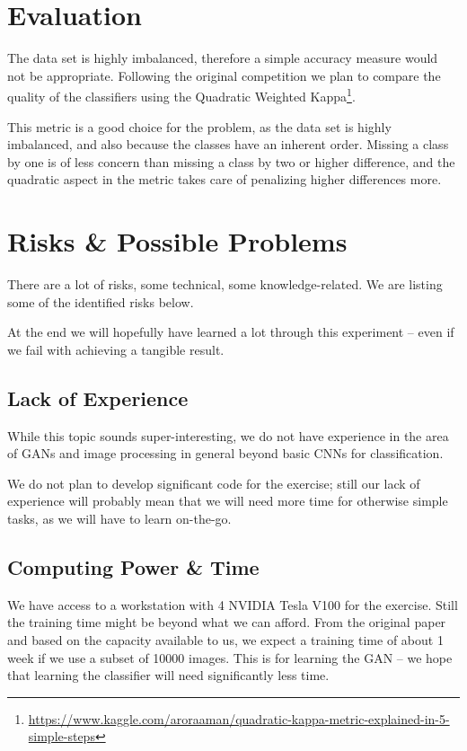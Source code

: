 \documentclass[sigconf,nonacm]{acmart}
\begin{document}
\section{Evaluation}

The data set is highly imbalanced, therefore a simple
accuracy measure would not be appropriate.
Following the original
competition we plan to compare the quality of the classifiers
using the Quadratic Weighted
Kappa\footnote{\url{https://www.kaggle.com/aroraaman/quadratic-kappa-metric-explained-in-5-simple-steps}}.

This metric is a good choice for the problem, as the data set
is highly imbalanced, and also because the classes have an
inherent order.
Missing a class by one is of less concern than missing a class
by two or higher difference, and the quadratic
aspect in the metric takes care of penalizing higher differences
more.

\section{Risks \& Possible Problems}

There are a lot of risks, some technical, some knowledge-related.
We are listing some of the identified risks below.

At the end we will hopefully have learned a lot through this
experiment -- even if we fail with achieving a tangible result.

\subsection{Lack of Experience}

While this topic sounds super-interesting, we do not have
experience in the area of GANs and image processing in general
beyond basic CNNs for classification.

We do not plan to develop significant code for the exercise; still
our lack of experience will probably mean that we will need
more time for otherwise simple tasks, as we will have to
learn on-the-go.

\subsection{Computing Power \& Time}

We have access to a workstation with 4 NVIDIA Tesla V100 for
the exercise.
Still the training time might be beyond what we can afford.
From the original paper and based on the capacity available
to us, we expect a training time of about 1 week if we use
a subset of \SI{10000}{} images.
This is for learning the GAN -- we hope that learning the
classifier will need significantly less time.
\end{document}
